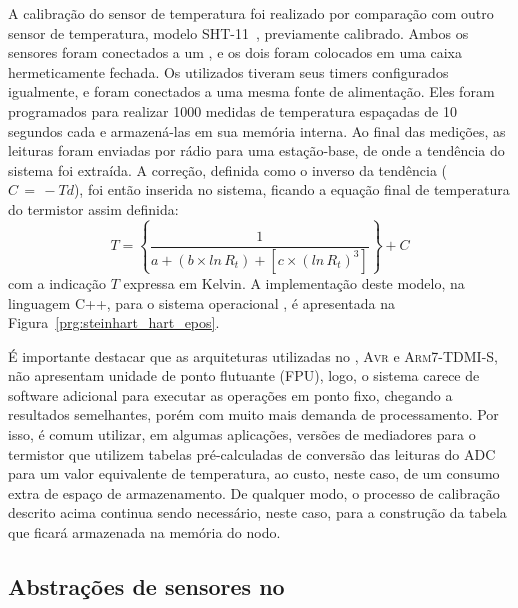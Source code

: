 A calibração do sensor de temperatura foi realizado por comparação com outro
sensor de temperatura, modelo SHT-11~\cite{Sensirion:SHT1x:2005}, previamente
calibrado. Ambos os sensores foram conectados a um \emote, e os dois \emote
foram colocados em uma caixa hermeticamente fechada. Os \emote utilizados
tiveram seus timers configurados igualmente, e foram conectados a uma mesma
fonte de alimentação. Eles foram programados para realizar 1000 medidas de
temperatura espaçadas de 10 segundos cada e armazená-las em sua memória interna.
Ao final das medições, as leituras foram enviadas por rádio para uma
estação-base, de onde a tendência do sistema foi extraída. A correção, definida
como o inverso da tendência ($C\,=\,-Td$), foi então inserida no sistema,
ficando a equação final de temperatura do termistor assim definida:
\begin{equation}
T = \left\{
\frac{1}{
a +
(b \times ln\,R_t) +
[c \times (ln\,R_t)^3]
}
\right\}
+ C
\end{equation}
com a indicação $T$ expressa em Kelvin. A implementação deste modelo, na
linguagem \textsc{C++}, para o sistema operacional \epos, é apresentada na
Figura~\ref{prg:steinhart_hart_epos}.

É importante destacar que as arquiteturas utilizadas no \emote, \textsc{Avr} e
\textsc{Arm7-TDMI-S}, não apresentam unidade de ponto flutuante (FPU), logo, o
sistema carece de software adicional para executar as operações em ponto fixo,
chegando a resultados semelhantes, porém com muito mais demanda de
processamento. Por isso, é comum utilizar, em algumas aplicações, versões de
mediadores para o termistor que utilizem tabelas pré-calculadas de conversão das
leituras do ADC para um valor equivalente de temperatura, ao custo, neste caso,
de um consumo extra de espaço de armazenamento. De qualquer modo, o processo de
calibração descrito acima continua sendo necessário, neste caso, para a
construção da tabela que ficará armazenada na memória do nodo.


\subsection{Abstrações de sensores no \epos}
\label{sec:epos_sensing}

